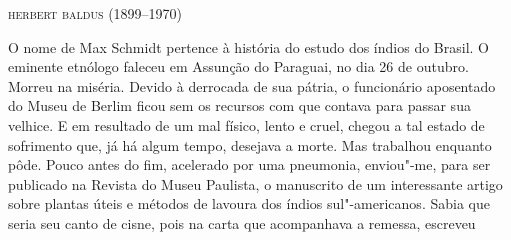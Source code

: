 \begin{flushright}
\textsc{herbert baldus (1899--1970)}\medskip
\end{flushright}

O nome de Max Schmidt pertence à história do estudo dos índios do
Brasil. O eminente etnólogo faleceu em Assunção do Paraguai, no dia 26
de outubro. Morreu na miséria. Devido à derrocada de sua pátria, o
funcionário aposentado do Museu de Berlim ficou sem os recursos com que
contava para passar sua velhice. E em resultado de um mal físico, lento
e cruel, chegou a tal estado de sofrimento que, já há algum tempo,
desejava a morte. Mas trabalhou enquanto pôde. Pouco antes do fim,
acelerado por uma pneumonia, enviou"-me, para ser publicado na Revista
do Museu Paulista, o manuscrito de um interessante artigo sobre plantas
úteis e métodos de lavoura dos índios sul"-americanos. Sabia que seria
seu canto de cisne, pois na carta que acompanhava a remessa, escreveu
